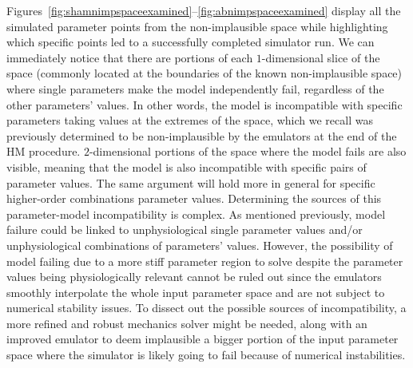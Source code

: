 \vspace{0.2cm}\noindent
Figures~\ref{fig:shamnimpspaceexamined}--\ref{fig:abnimpspaceexamined} display all the simulated parameter points from the non-implausible space while highlighting which specific points led to a successfully completed simulator run. We can immediately notice that there are portions of each $1$-dimensional slice of the space (commonly located at the boundaries of the known non-implausible space) where single parameters make the model independently fail, regardless of the other parameters' values. In other words, the model is incompatible with specific parameters taking values at the extremes of the space, which we recall was previously determined to be non-implausible by the emulators at the end of the HM procedure. $2$-dimensional portions of the space where the model fails are also visible, meaning that the model is also incompatible with specific pairs of parameter values. The same argument will hold more in general for specific higher-order combinations parameter values. Determining the sources of this parameter-model incompatibility is complex. As mentioned previously, model failure could be linked to unphysiological single parameter values and/or unphysiological combinations of parameters' values. However, the possibility of model failing due to a more stiff parameter region to solve despite the parameter values being physiologically relevant cannot be ruled out since the emulators smoothly interpolate the whole input parameter space and are not subject to numerical stability issues. To dissect out the possible sources of incompatibility, a more refined and robust mechanics solver might be needed, along with an improved emulator to deem implausible a bigger portion of the input parameter space where the simulator is likely going to fail because of numerical instabilities.

